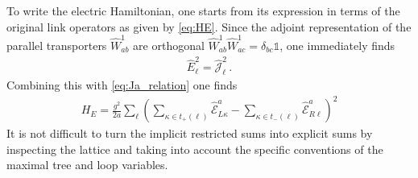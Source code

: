 \documentclass[reprint,superscriptaddress,pra,nofootinbib,preprintnumbers,floatfix]{revtex4-1}
\begin{document}
To write the electric Hamiltonian, one starts from its expression in terms of the original link operators as given by \cref{eq:HE}.
%
Since the adjoint representation of the parallel transporters $\hat W^{1}_{ab}$ are orthogonal $\hat W^{1}_{ab} \hat W^{1}_{ac} = \delta_{bc} \mathds{1}$, one immediately finds
%
\begin{align}
    \hat E_\ell^2 = 
        \hat{\mathcal{J}}^2_\ell
        \,.
\end{align}
%
Combining this with \cref{eq:Ja_relation} one finds
%
\begin{align}
\label{eq:HE_maxTree}
    H_E = \frac{g^2}{2 a} \sum_{\ell} \left( \sum_{\kappa \in t_+(\ell)} \hat{\mathcal{E}}^a_{L\kappa} - \sum_{\kappa \in t_{-}(\ell)} \hat{\mathcal{E}}^{a}_{R\ell} \right)^2
\end{align}
%
It is not difficult to turn the implicit restricted sums into explicit sums by inspecting the lattice and taking into account the specific conventions of the maximal tree and loop variables.




\end{document}
